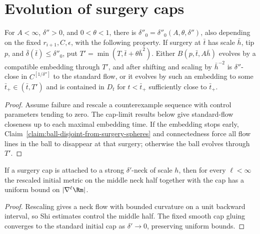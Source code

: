 \section{Evolution of surgery caps}

\begin{proposition}
\label{prop:surgery-cap-evolution-alternative}
\label{altern}
For $A<\infty$, $\delta''>0$, and $0<\theta<1$, there is $\delta''_0=\delta''_0(A,\theta,\delta'')$, also depending on the fixed $r_{i+1},C,\epsilon$, with the following property. If surgery at $\bar t$ has scale $\bar h$, tip $p$, and $\overline\delta(\bar t)\leq\delta''_0$, put $T'=\min(T,\bar t+\theta\bar h^2)$. Either $B(p,\bar t,A\bar h)$ evolves by a compatible embedding through $T'$, and after shifting and scaling by $\bar h^{-2}$ is $\delta''$-close in $C^{[1/\delta'']}$ to the standard flow, or it evolves by such an embedding to some $\bar t_+\in(\bar t,T')$ and is contained in $D_t$ for $t<\bar t_+$ sufficiently close to $\bar t_+$.
\end{proposition}
\begin{proof}
\sketch
{}
Assume failure and rescale a counterexample sequence with control parameters tending to zero. The cap-limit results below give standard-flow closeness up to each maximal embedding time. If the embedding stops early, Claim~\ref{claim:ball-disjoint-from-surgery-spheres} and connectedness force all flow lines in the ball to disappear at that surgery; otherwise the ball evolves through $T'$.
\end{proof}

\begin{claim}
\label{claim:surgery-cap-curvature-bound-uniform}
If a surgery cap is attached to a strong $\delta'$-neck of scale $h$, then for every $\ell<\infty$ the rescaled initial metric on the middle neck half together with the cap has a uniform bound on $|\nabla^\ell\Rm|$.
\end{claim}
\begin{proof}
\sketch
{}
Rescaling gives a neck flow with bounded curvature on a unit backward interval, so Shi estimates control the middle half. The fixed smooth cap gluing converges to the standard initial cap as $\delta'\to0$, preserving uniform bounds.
\end{proof}

